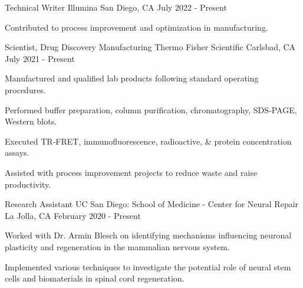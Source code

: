 \begin{cventries}
\cventry
    {Technical Writer} %
    {Illumina} %
    {San Diego, CA} %
    {July 2022 - Present} %
    {
      \begin{cvitems} %
        \item {Contributed to process improvement and optimization in manufacturing.}
      \end{cvitems}
    }
\cventry
    {Scientist, Drug Discovery Manufacturing} %
    {Thermo Fisher Scientific} %
    {Carlsbad, CA} %
    {July 2021 - Present} %
    {
      \begin{cvitems} %
        \item {Manufactured and qualified lab products following standard operating procedures.}
        \item {Performed buffer preparation, column purification, chromatography, SDS-PAGE, Western blots.}
        \item {Executed TR-FRET, immunofluorescence, radioactive, \& protein concentration assays.}
        \item {Assisted with process improvement projects to reduce waste and raise productivity.}
      \end{cvitems}
    }
\cventry
{Research Assistant} %
{UC San Diego: School of Medicine - Center for Neural Repair} %
{La Jolla, CA} %
{February 2020 - Present} %
{
  \begin{cvitems} %
    \item {Worked with Dr. Armin Blesch on identifying mechanisms influencing neuronal plasticity and regeneration in the mammalian nervous system.}
    \item {Implemented various techniques to investigate the potential role of neural stem cells and biomaterials in spinal cord regeneration.}

\end{cvitems}}
\end{cventries}
